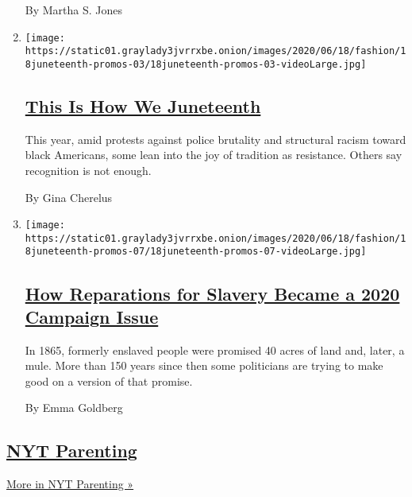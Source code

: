 \begin{enumerate}
  By Martha S. Jones
\item
  \texttt{[image: https://static01.graylady3jvrrxbe.onion/images/2020/06/18/fashion/18juneteenth-promos-03/18juneteenth-promos-03-videoLarge.jpg]}

  \hypertarget{this-is-how-we-juneteenth}{%
  \subsection{\texorpdfstring{\href{/article/juneteenth-celebration-history.html}{This
  Is How We
  Juneteenth}}{This Is How We Juneteenth}}\label{this-is-how-we-juneteenth}}

  This year, amid protests against police brutality and structural
  racism toward black Americans, some lean into the joy of tradition as
  resistance. Others say recognition is not enough.

  By Gina Cherelus
\item
  \texttt{[image: https://static01.graylady3jvrrxbe.onion/images/2020/06/18/fashion/18juneteenth-promos-07/18juneteenth-promos-07-videoLarge.jpg]}

  \hypertarget{how-reparations-for-slavery-became-a-2020-campaign-issue}{%
  \subsection{\texorpdfstring{\href{/2020/06/18/us/politics/reparations-slavery.html}{How
  Reparations for Slavery Became a 2020 Campaign
  Issue}}{How Reparations for Slavery Became a 2020 Campaign Issue}}\label{how-reparations-for-slavery-became-a-2020-campaign-issue}}

  In 1865, formerly enslaved people were promised 40 acres of land and,
  later, a mule. More than 150 years since then some politicians are
  trying to make good on a version of that promise.

  By Emma Goldberg
\end{enumerate}

\hypertarget{nyt-parenting}{%
\subsection{\texorpdfstring{\href{/spotlight/parenting}{NYT
Parenting}}{NYT Parenting}}\label{nyt-parenting}}

\href{/spotlight/parenting}{More in NYT Parenting »}

